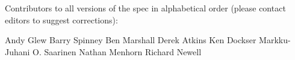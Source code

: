 
%
%

\noindent
Contributors to all versions of the spec in
alphabetical order (please contact editors to suggest
corrections):

Andy Glew
Barry Spinney
Ben Marshall
Derek Atkins
Ken Dockser
Markku-Juhani O. Saarinen
Nathan Menhorn
Richard Newell

